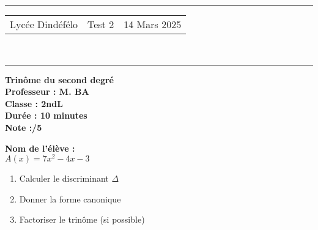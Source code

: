 \documentclass[a4paper,12pt]{article}
\begin{document}
\hrule %
\begin{center}
    \begin{tabular}{@{} p{5cm} p{5cm} p{5cm} @{}} %
        Lycée Dindéfélo & \quad\quad\quad Test 2 & 14 Mars 2025 \\
    \end{tabular}
    \\[-0.01cm] %
    \hrule %
\end{center}
\begin{center}
    \textbf{\Large Trinôme du second degré} \\[0.2cm]
    \textbf{\large Professeur : M. BA} \\[0.2cm]
    \textbf{Classe : 2ndL} \\[0.2cm]
    \textbf{\small Durée : 10 minutes} \\[0.2cm]
    \textbf{\small Note :\quad\quad /5}
\end{center}

\textbf{\small Nom de l'élève :} \underline{\hspace{8cm}} \\[0.5cm]

\( A(x) = 7x^2 - 4x - 3 \)

\begin{enumerate}
    \item Calculer le discriminant \(\Delta\)
    \item Donner la forme canonique
    \item Factoriser le trinôme (si possible)
\end{enumerate}
\end{document}
